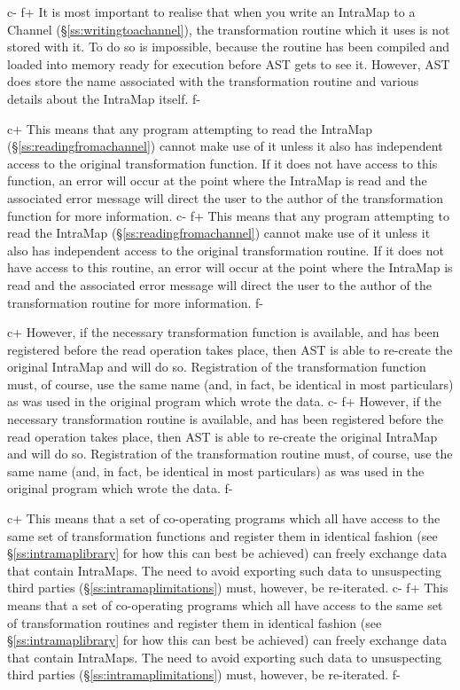 \documentclass[twoside,11pt]{article}
\newcommand{\secref}[1]{\S\ref{#1}}
\newcommand{\secref}[1]{\ref{#1}}
\begin{document}
c-
f+
It is most important to realise that when you write an IntraMap to a
Channel (\secref{ss:writingtoachannel}), the transformation routine
which it uses is not stored with it. To do so is impossible, because
the routine has been compiled and loaded into memory ready for
execution before AST gets to see it. However, AST does store the name
associated with the transformation routine and various details about
the IntraMap itself.
f-

c+
This means that any program attempting to read the IntraMap
(\secref{ss:readingfromachannel}) cannot make use of it unless it also
has independent access to the original transformation function. If it
does not have access to this function, an error will occur at the
point where the IntraMap is read and the associated error message will
direct the user to the author of the transformation function for more
information.
c-
f+
This means that any program attempting to read the IntraMap
(\secref{ss:readingfromachannel}) cannot make use of it unless it also
has independent access to the original transformation routine. If it
does not have access to this routine, an error will occur at the point
where the IntraMap is read and the associated error message will
direct the user to the author of the transformation routine for more
information.
f-

c+
However, if the necessary transformation function is available, and
has been registered before the read operation takes place, then AST is
able to re-create the original IntraMap and will do so. Registration
of the transformation function must, of course, use the same name
(and, in fact, be identical in most particulars) as was used in the
original program which wrote the data.
c-
f+
However, if the necessary transformation routine is available, and
has been registered before the read operation takes place, then AST is
able to re-create the original IntraMap and will do so. Registration
of the transformation routine must, of course, use the same name
(and, in fact, be identical in most particulars) as was used in the
original program which wrote the data.
f-

c+
This means that a set of co-operating programs which all have access
to the same set of transformation functions and register them in
identical fashion (see \secref{ss:intramaplibrary} for how this can
best be achieved) can freely exchange data that contain IntraMaps. The
need to avoid exporting such data to unsuspecting third parties
(\secref{ss:intramaplimitations}) must, however, be re-iterated.
c-
f+
This means that a set of co-operating programs which all have access
to the same set of transformation routines and register them in
identical fashion (see \secref{ss:intramaplibrary} for how this can
best be achieved) can freely exchange data that contain IntraMaps. The
need to avoid exporting such data to unsuspecting third parties
(\secref{ss:intramaplimitations}) must, however, be re-iterated.
f-
\end{document}
